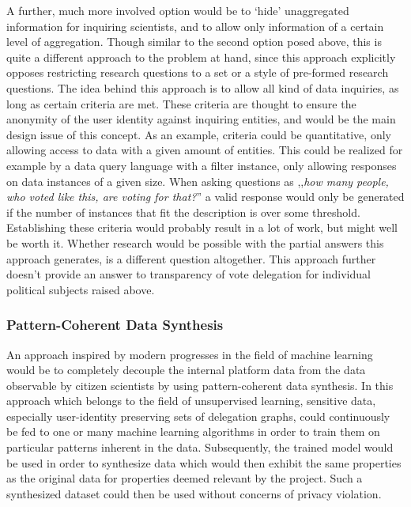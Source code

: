 A further, much more involved option would be to ‘hide' unaggregated information for inquiring scientists, and to allow only information of a certain level of aggregation. Though similar to the second option posed above, this is quite a different approach to the problem at hand, since this approach explicitly opposes restricting research questions to a set or a style of pre-formed research questions. The idea behind this approach is to allow all kind of data inquiries, as long as certain criteria are met. These criteria are thought to ensure the anonymity of the user identity against inquiring entities, and would be the main design issue of this concept. As an example, criteria could be quantitative, only allowing access to data with a given amount of entities. This could be realized for example by a data query language with a filter instance, only allowing responses on data instances of a given size. When asking questions as ,,\textit{how many people, who voted like this, are voting for that?}'' a valid response would only be generated if the number of instances that fit the description is over some threshold. Establishing these criteria would probably result in a lot of work, but might well be worth it. Whether research would be possible with the partial answers this approach generates, is a different question altogether. 
This approach further doesn't provide an answer to transparency of vote delegation for individual political subjects raised above.


\subsubsection{Pattern-Coherent Data Synthesis}
\label{ssec:Integration_pattern}

An approach inspired by modern progresses in the field of machine learning~\parencite{Boesche2013} would be to completely decouple the internal platform data from the data observable by citizen scientists by using pattern-coherent data synthesis.
In this approach which belongs to the field of unsupervised learning, sensitive data, especially user-identity preserving sets of delegation graphs, could continuously be fed to one or many machine learning algorithms in order to train them on particular patterns inherent in the data.
Subsequently, the trained model would be used in order to synthesize data which would then exhibit the same properties as the original data for properties deemed relevant by the  project.
Such a synthesized dataset could then be used without concerns of privacy violation.
